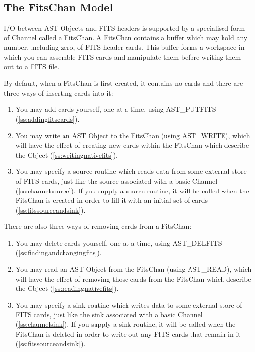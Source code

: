 \documentclass[twoside,11pt]{article}
\newcommand{\htmlref}[2]{#1}
\newcommand{\secref}[1]{\S\ref{#1}}
\renewcommand{\secref}[1]{\ref{#1}}
\begin{document}
\subsection{The FitsChan Model}

I/O between AST Objects and FITS headers is supported by a specialised
form of \htmlref{Channel}{Channel} called a \htmlref{FitsChan}{FitsChan}. A FitsChan contains a buffer which
may hold any number, including zero, of FITS header cards. This buffer
forms a workspace in which you can assemble FITS cards and manipulate
them before writing them out to a FITS file.

By default, when a FitsChan is first created, it contains no cards and
there are three ways of inserting cards into it:

\begin{enumerate}
\item You may add cards yourself, one at a time, using \htmlref{AST\_PUTFITS}{AST_PUTFITS}
(\secref{ss:addingfitscards}).

\item You may write an AST \htmlref{Object}{Object} to the FitsChan (using \htmlref{AST\_WRITE}{AST_WRITE}),
which will have the effect of creating new cards within the FitsChan
which describe the Object (\secref{ss:writingnativefits}).

\item You may specify a source routine which reads data from some
external store of FITS cards, just like the source associated with a
basic Channel (\secref{ss:channelsource}). If you supply a source
routine, it will be called when the FitsChan is created in order to
fill it with an initial set of cards (\secref{ss:fitssourceandsink}).
\end{enumerate}

There are also three ways of removing cards from a FitsChan:

\begin{enumerate}
\item You may delete cards yourself, one at a time, using \htmlref{AST\_DELFITS}{AST_DELFITS}
(\secref{ss:findingandchangingfits}).

\item You may read an AST Object from the FitsChan (using \htmlref{AST\_READ}{AST_READ}),
which will have the effect of removing those cards from the FitsChan
which describe the Object (\secref{ss:readingnativefits}).

\item You may specify a sink routine which writes data to some
external store of FITS cards, just like the sink associated with a
basic Channel (\secref{ss:channelsink}). If you supply a sink routine,
it will be called when the FitsChan is deleted in order to write out
any FITS cards that remain in it (\secref{ss:fitssourceandsink}).
\end{enumerate}
 
\end{document}
